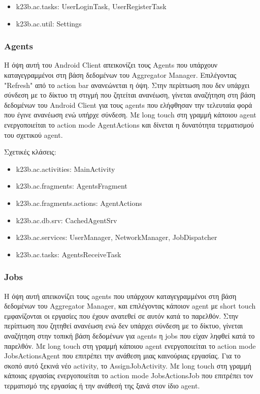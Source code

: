 \documentclass[a4paper,11pt]{article}
\begin{document}
\begin{sloppypar}
\begin{itemize}
\item k23b.ac.tasks: UserLoginTask, UserRegisterTask

\item k23b.ac.util: Settings

\end{itemize}

\newpage

\subsubsection{Agents}

Η όψη αυτή του Android Client απεικονίζει τους Agents που υπάρχουν καταγεγραμμένοι στη βάση δεδομένων του Aggregator Manager. Επιλέγοντας "Refresh" από το action bar ανανεώνεται η όψη. Στην περίπτωση που δεν υπάρχει σύνδεση με το δίκτυο τη στιγμή που ζητείται ανανέωση, γίνεται αναζήτηση στη βάση δεδομένων του Android Client για τους agents που ελήφθησαν την τελευταία φορά που έγινε ανανέωση ενώ υπήρχε σύνδεση. Με long touch στη γραμμή κάποιου agent ενεργοποιείται το action mode AgentActions και δίνεται η δυνατότητα τερματισμού του σχετικού agent.
\newline

Σχετικές κλάσεις:

\begin{itemize}

\item k23b.ac.activities: MainActivity

\item k23b.ac.fragments: AgentsFragment

\item k23b.ac.fragments.actions: AgentActions

\item k23b.ac.db.srv: CachedAgentSrv

\item k23b.ac.services: UserManager, NetworkManager, JobDispatcher

\item k23b.ac.tasks: AgentsReceiveTask

\end{itemize}

\subsubsection{Jobs}

Η όψη αυτή απεικονίζει τους agents που υπάρχουν καταγεγραμμένοι στη βάση δεδομένων του Aggregator Manager, και επιλέγοντας κάποιον agent με short touch εμφανίζονται οι εργασίες που έχουν ανατεθεί σε αυτόν κατά το παρελθόν. Στην περίπτωση που ζητηθεί ανανέωση ενώ δεν υπάρχει σύνδεση με το δίκτυο, γίνεται αναζήτηση στην τοπική βάση δεδομένων για agents η jobs που είχαν ληφθεί κατά το παρελθόν. Με long touch στη γραμμή κάποιου agent ενεργοποιείται το action mode JobsActionsAgent που επιτρέπει την ανάθεση μιας καινούριας εργασίας. Για το σκοπό αυτό ξεκινά νέο activity, το AssignJobActivity. Με long touch στη γραμμή κάποιας εργασίας ενεργοποιείται το action mode JobsActionsJob που επιτρέπει τον τερματισμό της εργασίας ή την ανάθεσή της ξανά στον ίδιο agent.
\newline



\end{sloppypar}
\end{document}
